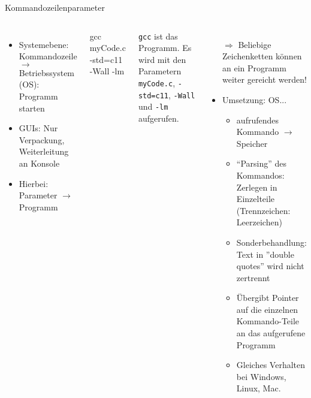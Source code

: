 \begin{frame}{Kommandozeilenparameter}
%
\begin{columns}[T]
\begin{itemize}
\item Systemebene: Kommandozeile $\rightarrow$ Betriebssystem (OS): Programm starten
\item GUIs: Nur Verpackung, Weiterleitung an Konsole
\item Hierbei: Parameter $\rightarrow$ Programm
\end{itemize}
%
\begin{cmdbox}
\footnotesize 
gcc myCode.c -std=c11 -Wall -lm
\end{cmdbox}
{\footnotesize \texttt{gcc} ist das Programm. Es wird mit den Parametern \texttt{myCode.c}, \texttt{-std=c11}, \texttt{-Wall} und \texttt{-lm} aufgerufen.}
%
%
\begin{itemize}
\item[$\Rightarrow$] Beliebige Zeichenketten können an ein Programm weiter gereicht werden!
\item Umsetzung: OS...
	\begin{itemize}
	\item aufrufendes Kommando $\rightarrow$ Speicher
	\item \enquote{Parsing} des Kommandos: Zerlegen in Einzelteile (Trennzeichen: Leerzeichen)
	\item Sonderbehandlung: Text in ''double quotes'' wird nicht zertrennt
	\item Übergibt Pointer auf die einzelnen Kommando-Teile an das aufgerufene Programm
	\item Gleiches Verhalten bei Windows, Linux, Mac.
	\end{itemize}
\end{itemize}
\end{columns}

%
\end{frame}


